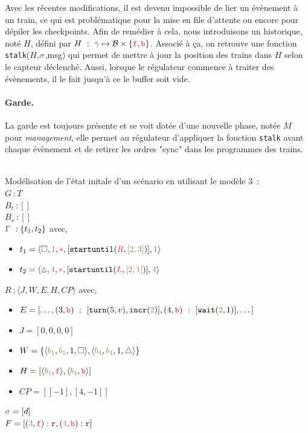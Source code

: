 \documentclass[oneside, a4paper, 11pt]{book}
\newcommand{\trainFmt}[1]{{\color{traincolor} #1}}
\newcommand{\trainTupleMF}[5]{\langle \trainFmt{#1}, \posFmt{#2}, \dirFmt{#3}, #4, \posFmt{#5} \rangle}
\newcommand{\forward}{\ensuremath{\mathtt{f}}}
\newcommand{\backward}{\ensuremath{\mathtt{b}}}
\newcommand{\dirFmt}[1]{{\color{dircolor} #1}}
\newcommand{\dirForward}{\ensuremath{\dirFmt{\forward}}}
\newcommand{\dirBackward}{\ensuremath{\dirFmt{\backward}}}
\newcommand{\posFmt}[1]{{\color{poscolor}{#1}}}
\newcommand{\bid}[1]{\ensuremath{\posFmt{b_{#1}}}}
\newcommand{\su}[2]{{\mbox{$\mathtt{startuntil}(\dirFmt{#1}, \posFmt{#2})$}}}
\newcommand{\incr}[1]{{\mbox{\ensuremath{\mathtt{incr}(\posFmt{#1})}}}}
\newcommand{\turnOrder}[2]{{\mbox{\ensuremath{\mathtt{turn}(#1, #2)}}}}
\newcommand{\wait}[2]{{\mbox{\ensuremath{\mathtt{wait}(\posFmt{#1}, #2)}}}}
\newcommand{\swFmt}[1]{{\color{swcolor}{#1}}}
\newcommand{\sigred}{{\mbox{${\color{red!50!black}\mathtt{r}}$}}}
\newcommand{\commentaire}[1]{{\color{commentcolor}{#1}}}
\begin{document}
Avec les récentes modifications, il est devenu impossible de lier un évènement à un train, ce qui est problématique pour la mise en file d'attente ou encore pour dépiler les checkpoints. Afin de remédier à cela, nous introduisons un historique, noté $H$, défini par $H~:~\trainFmt{\gamma} \mapsto \mathcal{B} \times \{\dirForward, \dirBackward\} $. Associé à ça, on retrouve une fonction \texttt{stalk}($H$,$\swFmt{\sigma}$,msg) qui permet de mettre à jour la position des trains dans $H$ selon le capteur déclenché.
Aussi, lorsque le régulateur commence à traiter des évènements, il le fait jusqu'à ce le buffer soit vide.


\paragraph{Garde.} La garde est toujours présente et se voit dotée d'une nouvelle phase, notée $M$ pour \textit{management}, elle permet au régulateur d'appliquer la fonction \texttt{stalk} avant chaque évènement et de retirer les ordres "sync" dans les programmes des trains.

\begin{example}[GoodEnding M3]
		~\\
	Modélisation de l'état initale d'un scénario en utilisant le modèle 3~:
	\\$G~: T$
	\vspace{0.3cm}
	\\$B_t~: []$ \commentaire{// vide}
	\vspace{0.3cm}
	\\$B_s~: []$ \commentaire{// vide}
	\vspace{0.3cm}
	\\$\trainFmt{\Gamma}~: \{t_1, t_2\}$ avec,
	\begin{itemize}
		\item[] $t_1 = \trainTupleMF{\square}{1}{*}{[\su{R}{[2,3]}]}{1}$
		\item[] $t_2 = \trainTupleMF{\vartriangle}{4}{*}{[\su{L}{[2,1]}]}{4}$
	\end{itemize}
	\vspace{0.3cm}
	$R~: \langle J,W,E,H,CP \rangle$ avec,	
	\begin{itemize}
		\item[] $E = [\dots,(3,\dirBackward)~:~[\turnOrder{5}{v}, \incr{2}], (4,\dirBackward)~:~[\wait{2}{1}],\dots]$
		\item[] $J = [0,0,0,0]$
		\item[] $W = \{\langle \bid{1}, \bid{1}, 1, \trainFmt{\square} \rangle, \langle \bid{4}, \bid{4}, 1, \trainFmt{\triangle} \rangle\}$
		\item[] $H = [\langle \bid{1}, \dirForward \rangle, \langle \bid{4}, \dirBackward \rangle]$
		\item[] $CP = [[-1],[4,-1]]$
	\end{itemize}
	\vspace{0.3cm}
	$\swFmt{\sigma} = [d]$
	\vspace{0.3cm}
	\\$F = [(\posFmt{3},\dirForward) : \sigred,(\posFmt{4},\dirBackward) : \sigred]$ \commentaire{// De base, tous les feux sont au vert}
\end{example}
\end{document}
